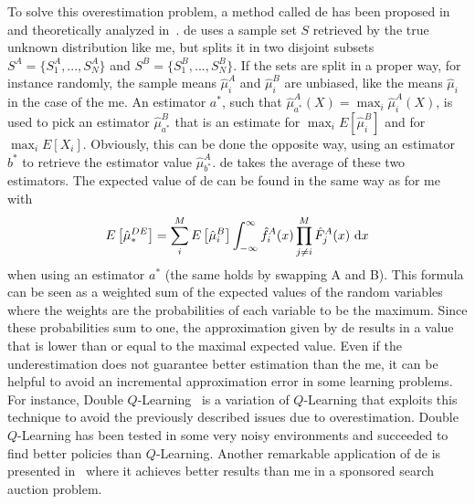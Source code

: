 To solve this overestimation problem, a method called \gls{de} has been proposed in~\cite{van2010double} and theoretically analyzed in~\cite{van2013estimating}. \gls{de} uses a sample set $S$ retrieved by the true unknown distribution like \gls{me}, but splits it in two disjoint subsets $S^A = \lbrace S^A_{1}, ..., S^A_{N} \rbrace$ and $S^B = \lbrace S^B_{1}, ..., S^B_{N} \rbrace$. If the sets are split in a proper way, for instance randomly, the sample means $\hat{\mu}^A_{i}$ and $\hat{\mu}^B_{i}$ are unbiased, like the means $\hat{\mu}_{i}$ in the case of the \gls{me}. An estimator $a^*$, such that $\hat\mu^A_{a^*}(X) = \max_{i}\hat\mu^A_{i}(X)$, is used to pick an estimator $\hat\mu^B_{a^*}$ that is an estimate for $\max_{i}E [ \hat\mu^B_{i} ]$ and for $\max_{i}E [ X_{i} ]$. Obviously, this can be done the opposite way, using an estimator $b^*$ to retrieve the estimator value $\hat{\mu}^A_{b^*}$. 
\gls{de} takes the average of these two estimators.
The expected value of \gls{de} can be found in the same way as for \gls{me} with
\begin{equation}\label{E:biasCV}
E\left[\hat\mu_*^{DE}\right]=\sum^M_i E \left[ \hat\mu^B_i \right] \int^{\infty}_{-\infty} \hat f^A_i(x) \prod^M_{j \neq i} \hat F^A_j(x)~\mathrm{d}x
\end{equation}
when using an estimator $a^*$ (the same holds by swapping A and B).
This formula can be seen as a weighted sum of the expected values of the random variables where the weights are the probabilities of each variable to be the maximum. Since these probabilities sum to one, the approximation given by \gls{de} results in a value that is lower than or equal to the maximal expected value. Even if the underestimation does not guarantee better estimation than the \gls{me}, it can be helpful to avoid an incremental approximation error in some learning problems. For instance, Double $Q$-Learning~\cite{van2010double} is a variation of $Q$-Learning that exploits this technique to avoid the previously described issues due to overestimation. Double $Q$-Learning has been tested in some very noisy environments and succeeded to find better policies than $Q$-Learning. Another remarkable application of \gls{de} is presented in~\cite{xu2013mab} where it achieves better results than \gls{me} in a sponsored search auction problem.

